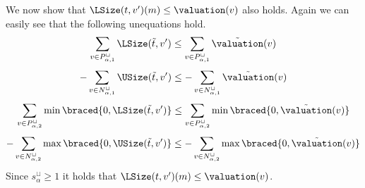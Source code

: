 We now show that $\LSize(t, v')(m) \leq \valuation(v)$ also holds.
Again we can easily see that the following unequations hold.
\[ \sum_{v \in P_{\alpha,1}^\sqcup} \LSize(\tilde{t}, v') \leq \sum_{v \in P_{\alpha,1}^\sqcup} \tilde{\valuation}(v) \]
\[ - \sum_{v \in N_{\alpha,1}^\sqcup} \USize(\tilde{t}, v') \leq - \sum_{v \in N_{\alpha,1}^\sqcup} \tilde{\valuation}(v) \]
\[ \sum_{v \in P_{\alpha,2}^\sqcup} \min \braced{0,\LSize(\tilde{t}, v')} \leq \sum_{v \in P_{\alpha,2}^\sqcup} \min \braced{0,\tilde{\valuation}(v)} \]
\[ - \sum_{v \in N_{\alpha,2}^\sqcup} \max \braced{0,\USize(\tilde{t}, v')} \leq - \sum_{v \in N_{\alpha,2}^\sqcup} \max \braced{0,\tilde{\valuation}(v)} \]
Since $s^\sqcup_\alpha \geq 1$ it holds that $\LSize(t, v')(m) \leq \valuation(v)$.
